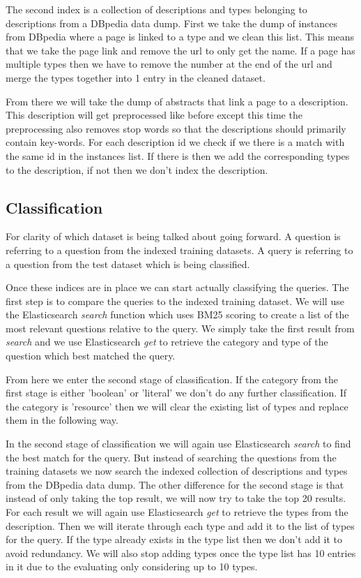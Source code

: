 \documentclass[sigconf]{acmart}
\begin{document}
The second index is a collection of descriptions and types belonging to descriptions from a DBpedia data dump. First we take the dump of instances from DBpedia where a page is linked to a type and we clean this list. This means that we take the page link and remove the url to only get the name. If a page has multiple types then we have to remove the number at the end of the url and merge the types together into 1 entry in the cleaned dataset.

From there we will take the dump of abstracts that link a page to a description. This description will get preprocessed like before except this time the preprocessing also removes stop words so that the descriptions should primarily contain key-words. For each description id we check if we there is a match with the same id in the instances list. If there is then we add the corresponding types to the description, if not then we don't index the description. 

\subsection{Classification}
\hfill \break
For clarity of which dataset is being talked about going forward. A question is referring to a question from the indexed training datasets. A query is referring to a question from the test dataset which is being classified. 
\hfill \break

Once these indices are in place we can start actually classifying the queries. The first step is to compare the queries to the indexed training dataset. We will use the Elasticsearch \emph{search} function which uses BM25 scoring to create a list of the most relevant questions relative to the query. We simply take the first result from \emph{search} and we use Elasticsearch \emph{get} to retrieve the category and type of the question which best matched the query.

From here we enter the second stage of classification. If the category from the first stage is either 'boolean' or 'literal' we don't do any further classification. If the category is 'resource' then we will clear the existing list of types and replace them in the following way.

In the second stage of classification we will again use Elasticsearch \emph{search} to find the best match for the query. But instead of searching the questions from the training datasets we now search the indexed collection of descriptions and types from the DBpedia data dump. The other difference for the second stage is that instead of only taking the top result, we will now try to take the top 20 results. For each result we will again use Elasticsearch \emph{get} to retrieve the types from the description. Then we will iterate through each type and add it to the list of types for the query. If the type already exists in the type list then we don't add it to avoid redundancy. We will also stop adding types once the type list has 10 entries in it due to the evaluating only considering up to 10 types. 
\end{document}
